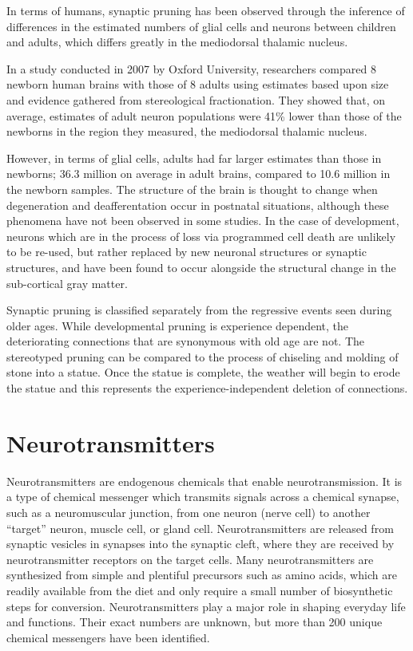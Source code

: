 In terms of humans, synaptic pruning has been observed through the inference of differences in the estimated numbers of glial cells and neurons between children and adults, which differs greatly in the mediodorsal thalamic nucleus.

In a study conducted in 2007 by Oxford University, researchers compared 8 newborn human brains with those of 8 adults using estimates based upon size and evidence gathered from stereological fractionation. They showed that, on average, estimates of adult neuron populations were 41\% lower than those of the newborns in the region they measured, the mediodorsal thalamic nucleus.

However, in terms of glial cells, adults had far larger estimates than those in newborns; 36.3 million on average in adult brains, compared to 10.6 million in the newborn samples. The structure of the brain is thought to change when degeneration and deafferentation occur in postnatal situations, although these phenomena have not been observed in some studies. In the case of development, neurons which are in the process of loss via programmed cell death are unlikely to be re-used, but rather replaced by new neuronal structures or synaptic structures, and have been found to occur alongside the structural change in the sub-cortical gray matter.

Synaptic pruning is classified separately from the regressive events seen during older ages. While developmental pruning is experience dependent, the deteriorating connections that are synonymous with old age are not. The stereotyped pruning can be compared to the process of chiseling and molding of stone into a statue. Once the statue is complete, the weather will begin to erode the statue and this represents the experience-independent deletion of connections.

\hypertarget{neurotransmitters}{%
\section{Neurotransmitters}\label{neurotransmitters}}

Neurotransmitters are endogenous chemicals that enable neurotransmission. It is a type of chemical messenger which transmits signals across a chemical synapse, such as a neuromuscular junction, from one neuron (nerve cell) to another ``target'' neuron, muscle cell, or gland cell. Neurotransmitters are released from synaptic vesicles in synapses into the synaptic cleft, where they are received by neurotransmitter receptors on the target cells. Many neurotransmitters are synthesized from simple and plentiful precursors such as amino acids, which are readily available from the diet and only require a small number of biosynthetic steps for conversion. Neurotransmitters play a major role in shaping everyday life and functions. Their exact numbers are unknown, but more than 200 unique chemical messengers have been identified.

